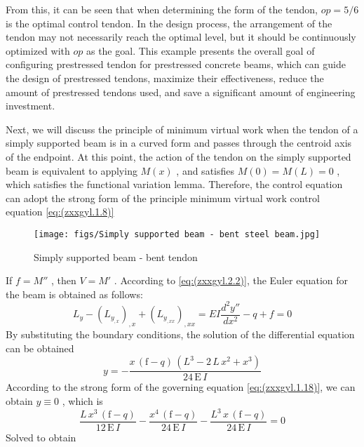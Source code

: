 From this, it can be seen that when determining the form of the tendon, $ op=5/6 $ is the optimal control tendon. In the design process, the arrangement of the tendon may not necessarily reach the optimal level, but it should be continuously optimized with $ op $ as the goal. This example presents the overall goal of configuring prestressed tendon for prestressed concrete beams, which can guide the design of prestressed tendons, maximize their effectiveness, reduce the amount of prestressed tendons used, and save a significant amount of engineering investment.

Next, we will discuss the principle of minimum virtual work when the tendon of a simply supported beam is in a curved form and passes through the centroid axis of the endpoint. At this point, the action of the tendon on the simply supported beam is equivalent to applying $ M (x) $ , and satisfies $ M (0)=M (L)=0 $ , which satisfies the functional variation lemma. Therefore, the control equation can adopt the strong form of the principle minimum virtual work control equation \ref{eq:(zxxgyl.1.8)}
\begin{figure}[h!] %
    \centering
    \texttt{[image: figs/Simply supported beam - bent steel beam.jpg]} 
    \caption{Simply supported beam - bent tendon}
    \label{fig:number}
\end{figure}
If $ f=M '' $ , then $ V=M '$ . According to \ref{eq:(zxxgyl.2.2)}, the Euler equation for the beam is obtained as follows:
\begin{equation}\label{eq:(example.yyl.4)}
L_{y} - \left(L_{y_{,x}}\right)_{,x}+\left(L_{y_{,xx}}\right)_{,xx}
=EI\frac{d^2y''}{dx^2}-q+f=0
\end{equation}
By substituting the boundary conditions, the solution of the differential equation can be obtained
\begin{equation}\label{eq:(example.yyl.4)}
y=-\frac{x\,{\left(\mathrm {f}-q \right)}\,{\left(L^3 -2\,L\,x^2 +x^3 \right)}}{24\,\textrm{E}\,I }
\end{equation}
According to the strong form of the governing equation \ref{eq:(zxxgyl.1.18)}, we can obtain $ y \equiv0 $ , which is
\begin{equation}\label{eq:(example.yyl.4)}
\frac{L\,x^3 \,{\left(\mathrm {f}-q \right)}}{12\,\textrm{E}\,I }-\frac{x^4 \,{\left(\mathrm {f}-q \right)}}{24\,\textrm{E}\,I }-\frac{L^3 \,x\,{\left(\mathrm {f}-q \right)}}{24\,\textrm{E}\,I }=0
\end{equation}
Solved to obtain
